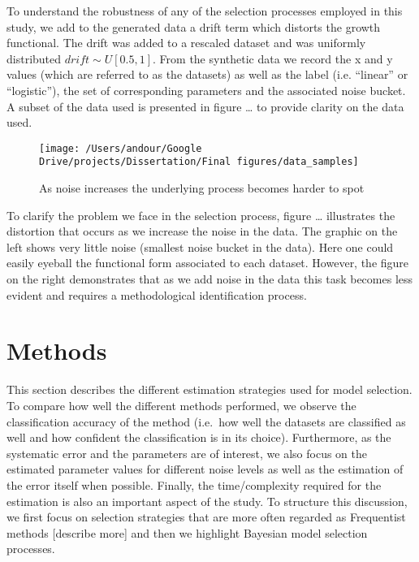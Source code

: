 \documentclass[]{article}
\begin{document}
To understand the robustness of any of the selection processes employed
in this study, we add to the generated data a drift term which distorts
the growth functional. The drift was added to a rescaled dataset and was
uniformly distributed \(drift \sim U[0.5, 1]\). From the synthetic data
we record the x and y values (which are referred to as the datasets) as
well as the label (i.e. ``linear'' or ``logistic''), the set of
corresponding parameters and the associated noise bucket. A subset of
the data used is presented in figure \ldots{} to provide clarity on the
data used.

\begin{figure}

{\centering \texttt{[image: /Users/andour/Google Drive/projects/Dissertation/Final figures/data\_samples]} 

}

\caption{As noise increases the underlying process becomes harder to spot}\label{fig:unnamed-chunk-2}
\end{figure}

To clarify the problem we face in the selection process, figure \ldots{}
illustrates the distortion that occurs as we increase the noise in the
data. The graphic on the left shows very little noise (smallest noise
bucket in the data). Here one could easily eyeball the functional form
associated to each dataset. However, the figure on the right
demonstrates that as we add noise in the data this task becomes less
evident and requires a methodological identification process.

\hypertarget{methods}{%
\section{Methods}\label{methods}}

This section describes the different estimation strategies used for
model selection. To compare how well the different methods performed, we
observe the classification accuracy of the method (i.e.~how well the
datasets are classified as well and how confident the classification is
in its choice). Furthermore, as the systematic error and the parameters
are of interest, we also focus on the estimated parameter values for
different noise levels as well as the estimation of the error itself
when possible. Finally, the time/complexity required for the estimation
is also an important aspect of the study. To structure this discussion,
we first focus on selection strategies that are more often regarded as
Frequentist methods {[}describe more{]} and then we highlight Bayesian
model selection processes.
\end{document}

